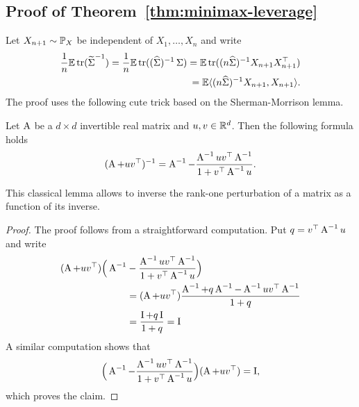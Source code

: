 \subsection{Proof of Theorem~\ref{thm:minimax-leverage}} %


Let $X_{n+1} \sim \P_X$ be independent of $X_1, \ldots, X_n$ and write
\begin{align*}
	\frac 1n \E \tr( \wt \bSigma^{-1}) 
	= \frac 1n \E \tr( (\wh \bSigma)^{-1} \bSigma) 
	= \E \tr( (n \wh \bSigma)^{-1} X_{n+1} X_{n+1}^\top) \\
	= \E \inr{(n \wh \bSigma)^{-1} X_{n+1}, X_{n+1}}.
\end{align*}
The proof uses the following cute trick based on the Sherman-Morrison lemma.

\begin{lemma}
	\label{lem:sherman-morrison}
	Let $\bA$ be a $d \times d$ invertible real matrix and $u, v \in \R^d$. Then the following formula holds
	\begin{equation*}
		(\bA + u v^\top)^{-1} = \bA^{-1} - \frac{\bA^{-1} u v^\top \bA^{-1} }{1 + v^\top \bA^{-1} u}.
	\end{equation*}
\end{lemma}
This classical lemma allows to inverse the rank-one perturbation of a matrix as a function of its inverse.
\begin{proof}
	The proof follows from a straightforward computation.
	Put $q = v^\top \bA^{-1} u$ and write
	\begin{align*}
	(\bA + u v^\top) \Big( \bA^{-1} &- \frac{\bA^{-1} u v^\top \bA^{-1}}{1 + v^\top \bA^{-1} u} \Big) \\
	& = (\bA + u v^\top) \frac{\bA^{-1} + q \bA^{-1} - \bA^{-1} u v^\top \bA^{-1}}{1 + q} \\
	&= \frac{\bI + q \bI}{1 + q} = \bI
	\end{align*}
	A similar computation shows that 
	\begin{equation*}
		\Big( \bA^{-1} - \frac{\bA^{-1} u v^\top \bA^{-1} }{1 + v^\top \bA^{-1} u} \Big) 
		(\bA + u v^\top) = \bI,
	\end{equation*}
	which proves the claim.
\end{proof}

